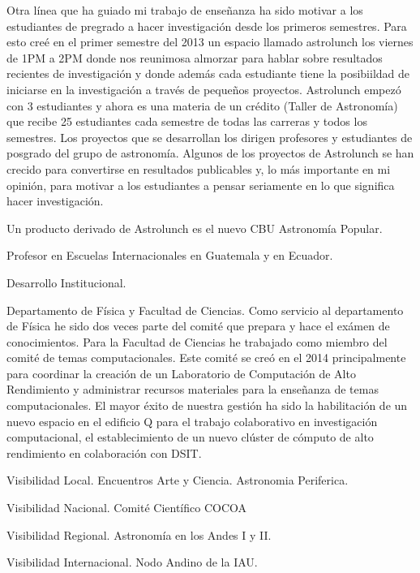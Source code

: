 Otra línea que ha guiado mi trabajo de enseñanza ha sido motivar a los estudiantes
de pregrado a hacer investigación desde los primeros semestres. Para
esto creé en el primer semestre del 2013 un espacio llamado astrolunch
los viernes de 1PM a 2PM donde nos reunimosa almorzar para hablar
sobre resultados recientes de investigación y donde además cada
estudiante tiene la posibiildad de iniciarse en la investigación a
través de pequeños proyectos. Astrolunch empezó con 3 estudiantes y
ahora es una materia de un crédito (Taller de Astronomía) que recibe
25 estudiantes cada semestre de todas las carreras y todos los
semestres. Los proyectos que se desarrollan los dirigen profesores y
estudiantes de posgrado del grupo de astronomía. Algunos de los
proyectos de Astrolunch se han crecido para convertirse en resultados
publicables y, lo más importante en mi opinión, para motivar a los
estudiantes a pensar seriamente en lo que significa hacer investigación.


Un producto derivado de Astrolunch es el nuevo CBU Astronomía
Popular. 

Profesor en Escuelas Internacionales en Guatemala y en Ecuador.


Desarrollo Institucional.

Departamento de Física y Facultad de Ciencias. Como servicio al departamento de Física he sido dos veces parte del comité que prepara y hace el exámen de conocimientos. 
Para la Facultad de Ciencias he trabajado como miembro del comité de temas computacionales. Este comité se creó en el 2014 principalmente para coordinar la creación de un Laboratorio de Computación de Alto Rendimiento y administrar recursos materiales para la enseñanza de temas computacionales. El mayor éxito de nuestra gestión ha sido la habilitación de un nuevo espacio en el edificio Q para el trabajo colaborativo en investigación computacional, el establecimiento de un nuevo clúster de cómputo de alto rendimiento en colaboración con DSIT.

Visibilidad Local. Encuentros Arte y Ciencia. Astronomia Periferica.

Visibilidad Nacional. Comité Científico COCOA

Visibilidad Regional. Astronomía en los Andes I y II.

Visibilidad Internacional. Nodo Andino de la IAU. 



